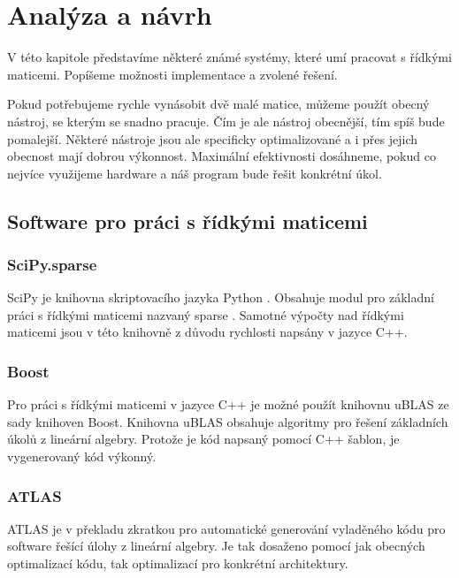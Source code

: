 \chapter{Analýza a návrh}

V této kapitole představíme některé známé systémy, které umí pracovat s řídkými maticemi. Popíšeme možnosti implementace a zvolené řešení.

Pokud potřebujeme rychle vynásobit dvě malé matice, můžeme použít obecný nástroj, se kterým se snadno pracuje. Čím je ale nástroj obecnější, tím spíš bude pomalejší. Některé nástroje jsou ale specificky optimalizované a i přes jejich obecnost mají dobrou výkonnost. Maximální efektivnosti dosáhneme, pokud co nejvíce využijeme hardware a náš program bude řešit konkrétní úkol. 

\section{Software pro práci s řídkými maticemi}

\subsection{SciPy.sparse}

SciPy je knihovna skriptovacího jazyka Python \cite{Python}. Obsahuje modul pro základní práci s řídkými maticemi nazvaný sparse \cite{scipy}. Samotné výpočty nad řídkými maticemi jsou v této knihovně z důvodu rychlosti napsány v jazyce C++.

\subsection{Boost}

Pro práci s řídkými maticemi v jazyce C++ je možné použít knihovnu uBLAS \cite{ublas} ze sady knihoven Boost\cite{boost}. Knihovna uBLAS obsahuje algoritmy pro řešení základních úkolů z lineární algebry. Protože je kód napsaný pomocí C++ šablon, je vygenerovaný kód výkonný.

\subsection{ATLAS}

ATLAS \cite{atlas} je v překladu zkratkou pro automatické generování vyladěného kódu pro software řešící úlohy z lineární algebry. Je tak dosaženo pomocí jak obecných optimalizací kódu, tak optimalizací pro konkrétní architektury.

